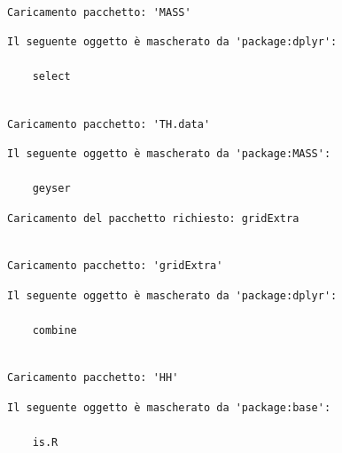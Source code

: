 \documentclass[
  letterpaper,
  DIV=11,
  numbers=noendperiod]{scrartcl}
\begin{document}
\begin{verbatim}

Caricamento pacchetto: 'MASS'
\end{verbatim}

\begin{verbatim}
Il seguente oggetto è mascherato da 'package:dplyr':

    select
\end{verbatim}

\begin{verbatim}

Caricamento pacchetto: 'TH.data'
\end{verbatim}

\begin{verbatim}
Il seguente oggetto è mascherato da 'package:MASS':

    geyser
\end{verbatim}

\begin{verbatim}
Caricamento del pacchetto richiesto: gridExtra
\end{verbatim}

\begin{verbatim}

Caricamento pacchetto: 'gridExtra'
\end{verbatim}

\begin{verbatim}
Il seguente oggetto è mascherato da 'package:dplyr':

    combine
\end{verbatim}

\begin{verbatim}

Caricamento pacchetto: 'HH'
\end{verbatim}

\begin{verbatim}
Il seguente oggetto è mascherato da 'package:base':

    is.R
\end{verbatim}
\end{document}
